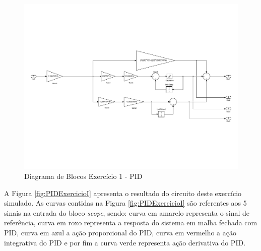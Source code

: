 	\begin{figure}[H]
		\centering
		\includegraphics[scale = .4]{Imagens/Exercicio1_PID_Simulink.pdf}
		\caption{Diagrama de Blocos Exercício 1 - PID}
		\label{fig:Exercicio1_PID_Simulink}
	\end{figure}
	
	A Figura \ref{fig:PIDExercicioI} apresenta o resultado do circuito deste exercício simulado. As curvas contidas na Figura \ref{fig:PIDExercicioI} são referentes aos 5 sinais na entrada do bloco \emph{scope}, sendo: curva em amarelo representa o sinal de referência, curva em roxo representa a  resposta do sistema em malha fechada com PID, curva em azul a ação proporcional do PID, curva em vermelho a ação integrativa do PID e por fim a curva verde representa ação derivativa do PID.
	
